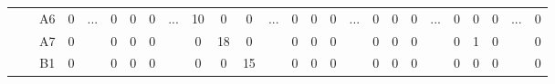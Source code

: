 \documentclass[12pt]{article}
\begin{document}
\begin{table}[!ht]
{\begin{tabular}{clcccccccccccccccccccccccc}
									& \multicolumn{1}{l|}{} & \multicolumn{1}{c|}{A6}   & \multicolumn{1}{c|}{0}    & \multicolumn{1}{c|}{\multirow{3}{*}{...}} & \multicolumn{1}{c|}{0}    & \multicolumn{1}{c|}{0}    & \multicolumn{1}{c|}{0}  & \multicolumn{1}{c|}{\multirow{3}{*}{...}} & \multicolumn{1}{c|}{10} & \multicolumn{1}{c|}{0}  & \multicolumn{1}{c|}{0}  & \multicolumn{1}{c|}{\multirow{3}{*}{...}} & \multicolumn{1}{c|}{0}    & \multicolumn{1}{c|}{0}    & \multicolumn{1}{c|}{0}    & \multicolumn{1}{c|}{\multirow{3}{*}{...}} & \multicolumn{1}{c|}{0}  & \multicolumn{1}{c|}{0}  & \multicolumn{1}{c|}{0}    & \multicolumn{1}{c|}{\multirow{3}{*}{...}} & \multicolumn{1}{c|}{0}    & \multicolumn{1}{c|}{0}    & \multicolumn{1}{c|}{0}  & \multicolumn{1}{c|}{\multirow{3}{*}{...}} & \multicolumn{1}{c|}{0}  \\ \cline{3-4} \cline{6-8} \cline{10-12} \cline{14-16} \cline{18-20} \cline{22-24} \cline{26-26} 
									& \multicolumn{1}{l|}{} & \multicolumn{1}{c|}{A7}   & \multicolumn{1}{c|}{0}    & \multicolumn{1}{c|}{}                     & \multicolumn{1}{c|}{0}    & \multicolumn{1}{c|}{0}    & \multicolumn{1}{c|}{0}  & \multicolumn{1}{c|}{}                     & \multicolumn{1}{c|}{0}  & \multicolumn{1}{c|}{18} & \multicolumn{1}{c|}{0}  & \multicolumn{1}{c|}{}                     & \multicolumn{1}{c|}{0}    & \multicolumn{1}{c|}{0}    & \multicolumn{1}{c|}{0}    & \multicolumn{1}{c|}{}                     & \multicolumn{1}{c|}{0}  & \multicolumn{1}{c|}{0}  & \multicolumn{1}{c|}{0}    & \multicolumn{1}{c|}{}                     & \multicolumn{1}{c|}{0}    & \multicolumn{1}{c|}{1}    & \multicolumn{1}{c|}{0}  & \multicolumn{1}{c|}{}                     & \multicolumn{1}{c|}{0}  \\ \cline{3-4} \cline{6-8} \cline{10-12} \cline{14-16} \cline{18-20} \cline{22-24} \cline{26-26} 
									& \multicolumn{1}{l|}{} & \multicolumn{1}{c|}{B1}   & \multicolumn{1}{c|}{0}    & \multicolumn{1}{c|}{}                     & \multicolumn{1}{c|}{0}    & \multicolumn{1}{c|}{0}    & \multicolumn{1}{c|}{0}  & \multicolumn{1}{c|}{}                     & \multicolumn{1}{c|}{0}  & \multicolumn{1}{c|}{0}  & \multicolumn{1}{c|}{15} & \multicolumn{1}{c|}{}                     & \multicolumn{1}{c|}{0}    & \multicolumn{1}{c|}{0}    & \multicolumn{1}{c|}{0}    & \multicolumn{1}{c|}{}                     & \multicolumn{1}{c|}{0}  & \multicolumn{1}{c|}{0}  & \multicolumn{1}{c|}{0}    & \multicolumn{1}{c|}{}                     & \multicolumn{1}{c|}{0}    & \multicolumn{1}{c|}{0}    & \multicolumn{1}{c|}{0}  & \multicolumn{1}{c|}{}                     & \multicolumn{1}{c|}{0}  \\ \cline{3-4} \cline{6-8} \cline{10-12} \cline{14-16} \cline{18-20} \cline{22-24} \cline{26-26} 

\end{tabular}}
\end{table}
\end{document}
